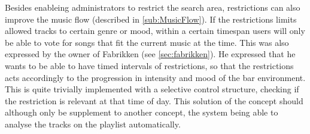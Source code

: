 Besides enableing administrators to restrict the search area, restrictions can also improve the music flow (described in \cref{sub:MusicFlow}). If the restrictions limits allowed tracks to certain genre or mood, within a certain timespan users will only be able to vote for songs that fit the current music at the time. This was also expressed by the owner of Fabrikken (see \cref{sec:fabrikken}). He expressed that he wants to be able to have timed intervals of restrictions, so that the restrictions acts accordingly to the progression in intensity and mood of the bar environment. This is quite trivially implemented with a selective control structure, checking if the restriction is relevant at that time of day. This solution of the concept should although only be supplement to another concept, the system being able to analyse the tracks on the playlist automatically.